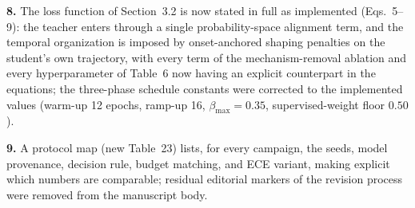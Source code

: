 \documentclass[1p,12pt,authoryear]{elsarticle}
\begin{document}
\vspace{2mm}
\noindent \textbf{8.} The loss function of Section~3.2 is now stated in full as implemented (Eqs.~5--9): the teacher enters through a single probability-space alignment term, and the temporal organization is imposed by onset-anchored shaping penalties on the student's own trajectory, with every term of the mechanism-removal ablation and every hyperparameter of Table~6 now having an explicit counterpart in the equations; the three-phase schedule constants were corrected to the implemented values (warm-up 12 epochs, ramp-up 16, $\beta_{\max}=0.35$, supervised-weight floor $0.50$).

\vspace{2mm}
\noindent \textbf{9.} A protocol map (new Table~23) lists, for every campaign, the seeds, model provenance, decision rule, budget matching, and ECE variant, making explicit which numbers are comparable; residual editorial markers of the revision process were removed from the manuscript body.
\end{document}
